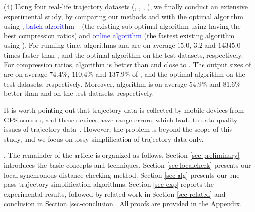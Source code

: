 \sstab (4) Using four real-life trajectory datasets (\sercar, \geolife, \mopsi, \pricar),
we finally conduct an extensive experimental study, by comparing our methods \cist and \cista  with the optimal \lsa algorithm using \sed, \textcolor{blue}{batch algorithm} \dps~\cite{Meratnia:Spatiotemporal} (the existing sub-optimal \lsa algorithm using \sed having the best compression ratios) and \textcolor{blue}{online algorithm} \squishe \cite{Muckell:Compression} (the fastest existing \lsa algorithm using \sed).
%
For running time, algorithms \cist and \cista are on average $15.0$, $3.2$ and $14345.0$ times faster than \dps, \squishe and the optimal \lsa algorithm on the test datasets, respectively.
%
For compression ratios, algorithm \cist is better than \squishe and close to \dps. The output sizes of \cist are on average $74.4\%$, $110.4\%$ and $137.9\%$ of \squishe, \dps and the optimal \lsa algorithm on the test datasets, respectively.
Moreover, algorithm \cista is on average $54.9\%$ and $81.6\%$ better than \squishe and \dps on the test datasets, respectively.

It is worth pointing out that trajectory data is collected by mobile devices from GPS sensors, and these devices have range errors, which leads to data quality issues of  trajectory data~\cite{PfoserJ99,ZufleTPRRLDE17}. However, the problem is beyond the scope of this study, and we focus on lossy simplification of trajectory data only.
%

.
The remainder of the article is organized as follows.
Section \ref{sec-preliminary} introduces the basic concepts and techniques.
Section \ref{sec-localcheck} presents our local synchronous distance checking method.
Section \ref{sec-alg} presents our one-pass trajectory simplification algorithms.
Section \ref{sec-exp} reports the experimental results, followed by related work in
Section \ref{sec-related} and conclusion in Section \ref{sec-conclusion}.
All proofs are provided in the Appendix.





